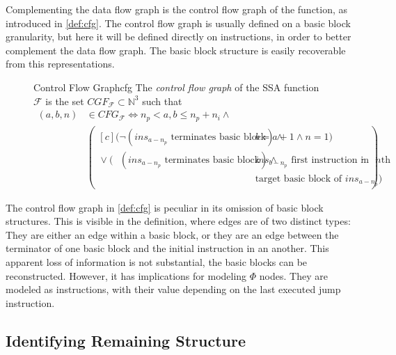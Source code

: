     Complementing the data flow graph is the control flow graph of the function,
    as introduced in \autoref{def:cfg}.
    The control flow graph is usually defined on a basic block granularity, but
    here it will be defined directly on instructions, in order to better
    complement the data flow graph.
    The basic block structure is easily recoverable from this representations.

\begin{figure}[h]
\begin{definition}{Control Flow Graph}{cfg}
    The {\em control flow graph} of the SSA function $\mathcal F$ is the set
    $CGF_{\mathcal F}\subset \mathbb N^3$ such that
    \begin{align*}
        (a,b,n)&{}\in CFG_{\mathcal F}\iff n_p<a,b\leq n_p+n_i\mathrel{\land}\\
               &\left(\begin{aligned}[c]
                                    (\neg (ins_{a-n_p}\text{ terminates basic block})\mathrel{\land}{}&b=a+1\mathrel{\land}n=1)\\
                      \mathrel{\lor}(\phantom{\neg}(ins_{a-n_p}\text{ terminates basic block})\mathrel{\land}{}&ins_{b-n_p}\text{ first instruction in}\text{ $n$th}\\[-0.5em]
                                                   &\text{target basic block of }ins_{a-n_p})
        \end{aligned}\right).
    \end{align*}
\end{definition}
\end{figure}

    The control flow graph in \autoref{def:cfg} is peculiar in its omission of
    basic block structures.
    This is visible in the definition, where edges are of two distinct types:
    They are either an edge within a basic block, or they are an edge between
    the terminator of one basic block and the initial instruction in an another.
    This apparent loss of information is not substantial, the basic blocks can
    be reconstructed.
    However, it has implications for modeling $\Phi$ nodes.
    They are modeled as instructions, with their value depending on the last
    executed jump instruction.

\subsection{Identifying Remaining Structure}

